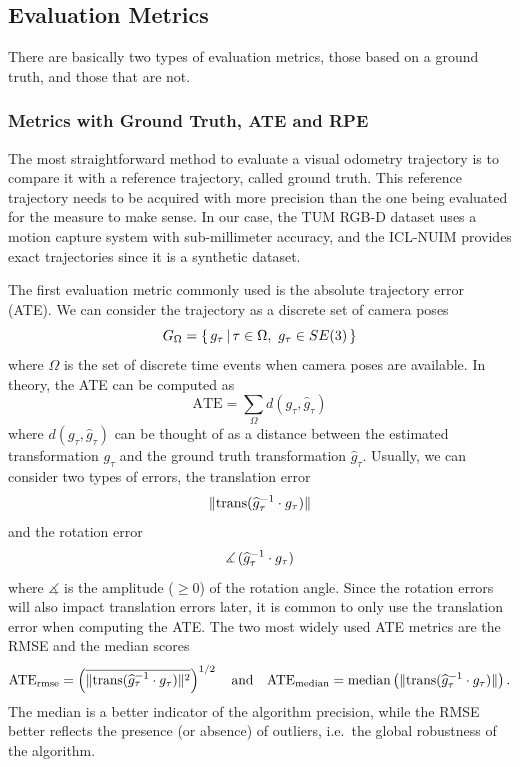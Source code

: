 \subsection{Evaluation Metrics}%
\label{sub:metrics}

There are basically two types of evaluation metrics,
those based on a ground truth, and those that are not.

\subsubsection{Metrics with Ground Truth, ATE and RPE}%
\label{ssub:metrics_gt}

The most straightforward method to evaluate a visual odometry trajectory
is to compare it with a reference trajectory, called ground truth.
This reference trajectory needs to be acquired with more precision
than the one being evaluated for the measure to make sense.
In our case, the TUM RGB-D dataset uses a motion capture system with sub-millimeter accuracy,
and the ICL-NUIM provides exact trajectories since it is a synthetic dataset.

The first evaluation metric commonly used is the absolute trajectory error (ATE).
We can consider the trajectory as a discrete set of camera poses
\[
	G_{\Omega} = \left\{\, {g_{\tau}} \, \middle| \, {\tau \in \Omega,\ g_{\tau} \in SE(3)} \,\right\}
\]
where $\Omega$ is the set of discrete time events when camera poses are available.
In theory, the ATE can be computed as
\[
	\text{ATE} = \sum_{\Omega} d(g_{\tau}, \widehat{g}_{\tau})
\]
where $d(g_{\tau}, \widehat{g}_{\tau})$ can be thought of
as a distance between the estimated transformation $g_{\tau}$
and the ground truth transformation $\widehat{g}_{\tau}$.
Usually, we can consider two types of errors, the translation error
\[
	\| \text{trans}(\widehat{g}_{\tau}^{-1} \cdot g_{\tau}) \|
\]
and the rotation error
\[
	\measuredangle \, (\widehat{g}_{\tau}^{-1} \cdot g_{\tau})
\]
where $\measuredangle$ is the amplitude ($\geq 0$) of the rotation angle.
Since the rotation errors will also impact translation errors later,
it is common to only use the translation error when computing the ATE.
The two most widely used ATE metrics are the RMSE and the median scores
\[
	\text{ATE}_{\text{rmse}} =
		\left(
			\overline{\| \text{trans}(\widehat{g}_{\tau}^{-1} \cdot g_{\tau}) \|^2}
		\right)^{1/2}
	\quad \text{and} \quad
	\text{ATE}_{\text{median}} =
		\text{median} \left( \| \text{trans}(\widehat{g}_{\tau}^{-1} \cdot g_{\tau}) \| \right).
\]
The median is a better indicator of the algorithm precision,
while the RMSE better reflects the presence (or absence) of outliers,
i.e.\ the global robustness of the algorithm.

